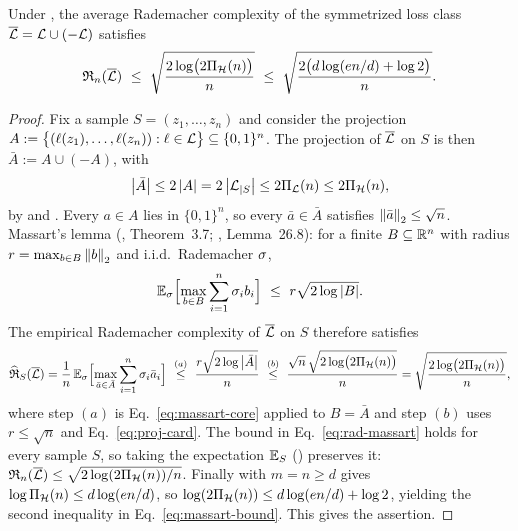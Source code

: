 \begin{lemma}\label{lem:massart-rademacher}
Under , the average Rademacher complexity of the symmetrized loss
class $\overline{\mathcal{L}}=\mathcal{L}\cup(-\mathcal{L})$ satisfies
\begin{align}\label{eq:massart-bound}
\Rad_n(\Lbar)\ \le\ \sqrt{\frac{2\log\bigl(2\Growth_{\Hcal}(n)\bigr)}{n}}
\ \le\ \sqrt{\frac{2\bigl(d\log(en/d)+\log 2\bigr)}{n}}.
\end{align}
\end{lemma}

\begin{proof}
Fix a sample $S=(z_1,\dots,z_n)$ and consider the projection
$A:=\bigl\{(\ell(z_1),\dots,\ell(z_n)):\ell\in\mathcal{L}\bigr\}\subseteq\{0,1\}^{n}$.
The projection of $\overline{\mathcal{L}}$ on $S$ is then $\bar A:=A\cup(-A)$, with
\begin{align}\label{eq:proj-card}
\left| \bar A \right|\le 2\left| A \right|=2\left| \mathcal{L}_{|S} \right|\le 2\Pi_{\mathcal{L}}(n)
\le 2\Pi_{\mathcal{H}}(n),
\end{align}
by  and . Every $a\in A$ lies in
$\{0,1\}^{n}$, so every $\bar a\in\bar A$ satisfies $\left\| \bar a \right\|_2\le\sqrt{n}$.
Massart's lemma (\cite{mohri2018foundations}, Theorem~3.7;
\cite{shalev2014understanding}, Lemma~26.8): for a finite $B\subseteq\mathbb{R}^{n}$ with
radius $r=\max_{b\in B}\left\| b \right\|_2$ and i.i.d.\ Rademacher $\sigma$,
\begin{align}\label{eq:massart-core}
\mathbb{E}_{\sigma}\Bigl[\max_{b\in B}\sum_{i=1}^{n}\sigma_i b_i\Bigr]
\ \le\ r\sqrt{2\log\left| B \right|}.
\end{align}
The empirical Rademacher complexity of $\overline{\mathcal{L}}$ on $S$ therefore satisfies
\begin{align}\label{eq:rad-massart}
\Radhat_S(\Lbar)
=\frac1n\,\E_{\sgn}\Bigl[\max_{\bar a\in\bar A}\sum_{i=1}^{n}\sgn_i \bar a_i\Bigr]
\ \overset{(a)}{\le}\ \frac{r\sqrt{2\log\abs{\bar A}}}{n}
\ \overset{(b)}{\le}\ \frac{\sqrt{n}\,\sqrt{2\log\bigl(2\Growth_{\Hcal}(n)\bigr)}}{n}
=\sqrt{\frac{2\log\bigl(2\Growth_{\Hcal}(n)\bigr)}{n}},
\end{align}
where step $(a)$ is Eq.~\eqref{eq:massart-core} applied to $B=\bar A$ and step
$(b)$ uses $r\le\sqrt{n}$ and Eq.~\eqref{eq:proj-card}. The bound in
Eq.~\eqref{eq:rad-massart} holds for every sample $S$, so taking the expectation
$\mathbb{E}_S$ () preserves it:
$\mathfrak{R}_n(\overline{\mathcal{L}})\le\sqrt{2\log(2\Pi_{\mathcal{H}}(n))/n}$. Finally
 with $m=n\ge d$ gives
$\log\Pi_{\mathcal{H}}(n)\le d\log(en/d)$, so
$\log(2\Pi_{\mathcal{H}}(n))\le d\log(en/d)+\log 2$, yielding the second inequality
in Eq.~\eqref{eq:massart-bound}. This gives the assertion.
\end{proof}
